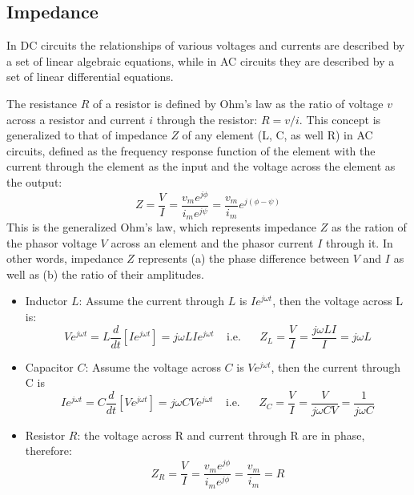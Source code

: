 \documentclass{article}
\begin{document}
\subsection*{Impedance}

In DC circuits the relationships of various voltages and currents are described 
by a set of linear algebraic equations, while in AC circuits they are described
by a set of linear differential equations. 

The resistance $R$ of a resistor is defined by Ohm's law as the ratio of voltage 
$v$ across a resistor and current $i$ through the resistor: $ R=v/i$.
This concept is generalized to that of impedance $Z$ of any element (L, C, as
well R) in AC circuits, defined as the frequency response function of the element
with the current through the element as the input and the voltage across the element
as the output:
\begin{equation}
Z=\frac{V}{I}=\frac{v_m e^{j\phi}}{i_m e^{j\psi}}=\frac{v_m}{i_m} e^{j(\phi-\psi)} 
\end{equation}
This is the generalized Ohm's law, which represents impedance $Z$ as the ration 
of the phasor voltage $V$ across an element and the phasor current $I$ through it.
In other words, impedance $Z$ represents (a) the phase difference between $V$ and 
$I$ as well as (b) the ratio of their amplitudes.


\begin{itemize}
\item Inductor $L$: Assume the current through $L$ is $I e^{j\omega t}$, 
  then the voltage across L is:
  \begin{equation} V e^{j\omega t}=L\frac{d}{dt} [I e^{j\omega t}]=j\omega L I e^{j\omega t}
  \;\;\;\;\mbox{i.e.}\;\;\;\;\;\;Z_L=\frac{V}{I}=\frac{j\omega LI}{I}=j\omega L \end{equation}
\item Capacitor $C$: Assume the voltage across $C$ is $V e^{j\omega t}$, 
  then the current through C is
  \begin{equation} I e^{j\omega t}=C\frac{d}{dt} [V e^{j\omega t}]=j\omega C V e^{j\omega t}
  \;\;\;\;\mbox{i.e.}\;\;\;\;\;\;Z_C=\frac{V}{I}=\frac{V}{j\omega CV}=\frac{1}{j\omega C} \end{equation}
\item Resistor $R$: the voltage across R and current through R are in phase, therefore:
  \begin{equation} Z_R=\frac{V}{I}=\frac{v_me^{j\phi}}{i_me^{j\phi}}=\frac{v_m}{i_m}=R \end{equation}
\end{itemize}
\end{document}
